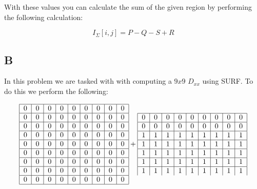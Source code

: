 \documentclass{article}
\begin{document}
With these values you can calculate the sum of the given region by performing the following calculation:

\begin{equation}
    I_\Sigma[i,j] = P - Q - S + R
\end{equation}

\subsection*{B}

In this problem we are tasked with with computing a $9x9$ $D_{xx}$ using SURF. To do this we perform the following:

\begin{equation}
    \begin{tabular}{ | c | c | c | c | c | c | c | c | c | }
        \hline
        0 & 0 & 0 & 0 & 0 & 0 & 0 & 0 & 0 \\ 
        \hline
        0 & 0 & 0 & 0 & 0 & 0 & 0 & 0 & 0 \\ 
        \hline
        0 & 0 & 0 & 0 & 0 & 0 & 0 & 0 & 0 \\ 
        \hline
        0 & 0 & 0 & 0 & 0 & 0 & 0 & 0 & 0 \\ 
        \hline
        0 & 0 & 0 & 0 & 0 & 0 & 0 & 0 & 0 \\ 
        \hline
        0 & 0 & 0 & 0 & 0 & 0 & 0 & 0 & 0 \\ 
        \hline
        0 & 0 & 0 & 0 & 0 & 0 & 0 & 0 & 0 \\ 
        \hline
        0 & 0 & 0 & 0 & 0 & 0 & 0 & 0 & 0 \\ 
        \hline
        0 & 0 & 0 & 0 & 0 & 0 & 0 & 0 & 0 \\ 
        \hline
    \end{tabular} + 
    \begin{tabular}{ | c | c | c | c | c | c | c | c | c | }
        \hline
        0 & 0 & 0 & 0 & 0 & 0 & 0 & 0 & 0 \\ 
        \hline
        0 & 0 & 0 & 0 & 0 & 0 & 0 & 0 & 0 \\ 
        \hline
        1 & 1 & 1 & 1 & 1 & 1 & 1 & 1 & 1 \\ 
        \hline
        1 & 1 & 1 & 1 & 1 & 1 & 1 & 1 & 1 \\ 
        \hline
        1 & 1 & 1 & 1 & 1 & 1 & 1 & 1 & 1 \\ 
        \hline
        1 & 1 & 1 & 1 & 1 & 1 & 1 & 1 & 1 \\ 
        \hline
        1 & 1 & 1 & 1 & 1 & 1 & 1 & 1 & 1 \\ 

\end{tabular}
\end{equation}
\end{document}

